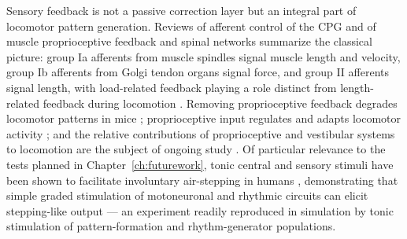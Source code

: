Sensory feedback is not a passive correction layer but an integral part of locomotor pattern generation. Reviews of afferent control of the CPG \citep{van_de_crommert_review_1998} and of muscle proprioceptive feedback and spinal networks \citep{windhorst_muscle_2007, windhorst_spinal_2022} summarize the classical picture: group Ia afferents from muscle spindles signal muscle length and velocity, group Ib afferents from Golgi tendon organs signal force, and group II afferents signal length, with load-related feedback playing a role distinct from length-related feedback during locomotion \citep{dietz_significance_2000}. Removing proprioceptive feedback degrades locomotor patterns in mice \citep{akay_degradation_2014}; proprioceptive input regulates and adapts locomotor activity \citep{lam_role_2002}; and the relative contributions of proprioceptive and vestibular systems to locomotion are the subject of ongoing study \citep{akay_relative_2021, akay_sensory_2020}. Of particular relevance to the tests planned in Chapter~\ref{ch:futurework}, tonic central and sensory stimuli have been shown to facilitate involuntary air-stepping in humans \citep{selionov_tonic_2009}, demonstrating that simple graded stimulation of motoneuronal and rhythmic circuits can elicit stepping-like output --- an experiment readily reproduced in simulation by tonic stimulation of pattern-formation and rhythm-generator populations.


